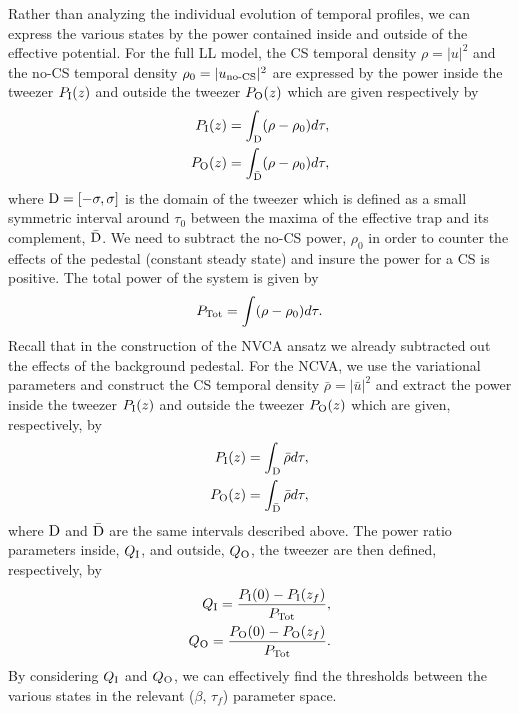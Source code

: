 \documentclass[aps,floatfix,showpacs,preprintnumbers,twocolumn,nofootinbib]{revtex4}
\begin{document}
Rather than analyzing the individual evolution of temporal profiles, we can express the various states by the power contained inside and outside of the effective potential.  For the full LL model, the CS temporal density $\rho = |u|^2$ and the no-CS temporal density $\rho_0 = |u_{\rm{no\text{-}CS}}|^2$ are expressed by the power inside the tweezer $P_{\rm I}(z)$ and outside the tweezer $P_{\rm O}(z)$ which are given respectively by 
\begin{align}
P_{\rm I}(z) = \int_{\rm D} (\rho - \rho_0) d\tau, \label{Pin} \\
P_{\rm O}(z) = \int_{\bar{\rm D}} (\rho - \rho_0) d\tau, \label{Pout}
\end{align} 
where ${\rm D} = [ -\sigma, \sigma]$ is the domain of the tweezer which is defined as a small symmetric interval around $\tau_0$ between the maxima of the effective trap and its complement, $\bar{\rm{D}}$.  We need to subtract the no-CS power, $\rho_0$ in order to counter the effects of the pedestal (constant steady state) and insure the power for a CS is positive.  The total power of the system is given by 
\begin{align}
P_{\rm Tot} = \int  (\rho - \rho_0) d\tau.
\end{align}
Recall that in the construction of the NVCA ansatz we already subtracted out the effects of the background pedestal.  For the NCVA, we use the variational parameters and construct the CS temporal density $\bar{\rho} = |\bar{u}|^2$ and extract the power inside the tweezer $P_{\rm I}(z)$ and outside the tweezer $P_{\rm O}(z)$ which are given, respectively, by 
\begin{align}
P_{\rm I}(z) = \int_{\rm D} \bar{\rho }d\tau, \label{PinNCVA} \\
P_{\rm O}(z) = \int_{\bar{\rm D}} \bar{\rho } d\tau, \label{PoutNCVA}
\end{align} 
where ${\rm D}$ and $\bar{{\rm D}}$ are the same intervals described above.
The power ratio parameters inside, $Q_{\rm I}$, and outside, $Q_{\rm O}$, the tweezer are then defined, respectively, by 
\begin{align}
Q_{\rm I} = \frac{P_{\rm I}(0) - P_{\rm I}(z_f)}{P_{\rm Tot} },\label{QIn} \\ 
Q_{\rm O}=  \frac{P_{\rm O}(0) - P_{\rm O}(z_f)}{P_{\rm Tot} }.
\label{QOut}
\end{align}
By considering $Q_{\rm I}$ and $Q_{\rm O}$, we can effectively find the thresholds between the various states in the relevant ($\beta$, $\tau_f$) parameter space.  
\end{document}
